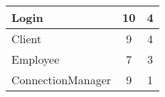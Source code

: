\begin{table}[!h]
\begin{tabular}{|l|c|c|}
Login                                                          & 10                                                                                             & 4                                                                                        \\ \hline
Client                                                         & 9                                                                                              & 4                                                                                        \\ \hline
Employee                                                       & 7                                                                                              & 3                                                                                        \\ \hline
ConnectionManager                                              & 9                                                                                              & 1                                                                                        \\ \hline
\end{tabular}
\end{table}